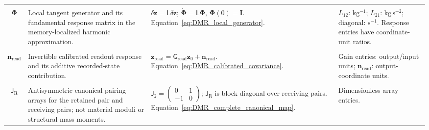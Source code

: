 \begin{longtable}{@{} c p{5.5cm} p{4cm} p{3.5cm} @{}}
\begin{tabular}[c]{@{}c@{}}$\mathsf L$ \\ $\boldsymbol\Phi$\end{tabular} & {\raggedright Local tangent generator and its fundamental response matrix in the memory-localized harmonic approximation.\par} & {\raggedright $\delta\dot{\mathbf z}=\mathsf L\delta\mathbf z$; $\dot{\boldsymbol\Phi}=\mathsf L\boldsymbol\Phi$, $\boldsymbol\Phi(0)=\mathbf I$. \newline Equation~\eqref{eq:DMR_local_generator}.\par} & {\raggedright $L_{12}$: $\mathrm{kg^{-1}}$; $L_{21}$: $\mathrm{kg\,s^{-2}}$; diagonal: $\mathrm{s^{-1}}$. Response entries have coordinate-unit ratios.\par} \\

\begin{tabular}[c]{@{}c@{}}$\mathsf G_{\mathrm{read}}$ \\ $\mathbf n_{\mathrm{read}}$\end{tabular} & {\raggedright Invertible calibrated readout response and its additive recorded-state contribution.\par} & {\raggedright $\mathbf z_{\mathrm{read}}=\mathsf G_{\mathrm{read}}\mathbf z_0+\mathbf n_{\mathrm{read}}$. \newline Equation~\eqref{eq:DMR_calibrated_covariance}.\par} & {\raggedright Gain entries: output/input units; $\mathbf n_{\mathrm{read}}$: output-coordinate units.\par} \\

\begin{tabular}[c]{@{}c@{}}$\mathsf J_2$ \\ $\mathsf J_{\mathrm R}$\end{tabular} & {\raggedright Antisymmetric canonical-pairing arrays for the retained pair and receiving pairs; not material moduli or structural mass moments.\par} & {\raggedright $\mathsf J_2=\left(\begin{smallmatrix}0&1\\-1&0\end{smallmatrix}\right)$; $\mathsf J_{\mathrm R}$ is block diagonal over receiving pairs. \newline Equation~\eqref{eq:DMR_complete_canonical_map}.\par} & {\raggedright Dimensionless array entries.\par} \\


\end{longtable}
